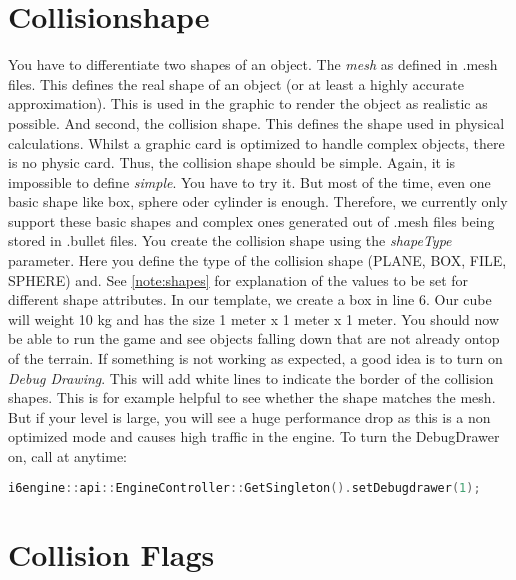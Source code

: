 \documentclass{article}
\begin{document}
\section{Collisionshape}

You have to differentiate two shapes of an object. The \textit{mesh} as defined in .mesh files. This defines the real shape of an object (or at least a highly accurate approximation). This is used in the graphic to render the object as realistic as possible. And second, the collision shape. This defines the shape used in physical calculations. Whilst a graphic card is optimized to handle complex objects, there is no physic card. Thus, the collision shape should be simple. Again, it is impossible to define \textit{simple}. You have to try it. But most of the time, even one basic shape like box, sphere oder cylinder is enough. Therefore, we currently only support these basic shapes and complex ones generated out of .mesh files being stored in .bullet files. You create the collision shape using the \textit{shapeType} parameter. Here you define the type of the collision shape (PLANE, BOX, FILE, SPHERE) and. See \ref{note:shapes} for explanation of the values to be set for different shape attributes. In our template, we create a box in line 6. Our cube will weight 10 kg and has the size 1 meter x 1 meter x 1 meter.\newline
You should now be able to run the game and see objects falling down that are not already ontop of the terrain. If something is not working as expected, a good idea is to turn on \textit{Debug Drawing}. This will add white lines to indicate the border of the collision shapes. This is for example  helpful to see whether the shape matches the mesh. But if your level is large, you will see a huge performance drop as this is a non optimized mode and causes high traffic in the engine. To turn the DebugDrawer on, call at anytime:
\begin{lstlisting}[language=C++, style=basic, caption={loading a level}, label=code:load]
i6engine::api::EngineController::GetSingleton().setDebugdrawer(1);
\end{lstlisting}

\section{Collision Flags}
\end{document}
